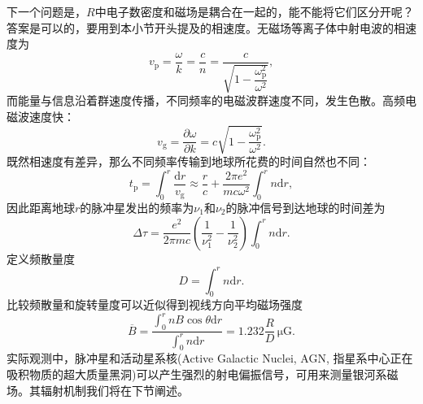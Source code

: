 \documentclass[../天体物理基础.tex]{subfiles}
\begin{document}
\newpage
下一个问题是，$R$中电子数密度和磁场是耦合在一起的，能不能将它们区分开呢？答案是可以的，要用到本小节开头提及的相速度。无磁场等离子体中射电波的相速度为
\begin{equation}
v_{\text{p}}=\frac{\omega}{k}=\frac{c}{n}=\frac{c}{\sqrt{1-\dfrac{\omega_{\text{p}}^{2}}{\omega^{2}}}},
\end{equation}
而能量与信息沿着群速度传播，不同频率的电磁波群速度不同，发生色散。高频电磁波速度快：
\begin{equation}
v_{\text{g}}=\frac{\partial{}\omega}{\partial{}k}=c\sqrt{1-\frac{\omega_{\text{p}}^{2}}{\omega^{2}}}.
\end{equation}
既然相速度有差异，那么不同频率传输到地球所花费的时间自然也不同：
\begin{equation}
t_{\text{p}}=\int_{0}^{r}\frac{\mathrm{d}r}{v_{\text{g}}}\approx\frac{r}{c}+\frac{2\pi e^{2}}{mc\omega^{2}}\int_{0}^{r}n\mathrm{d}r,
\end{equation}
因此距离地球$r$的脉冲星发出的频率为$\nu_{1}$和$\nu_{2}$的脉冲信号到达地球的时间差为
\begin{equation}
\Delta{}\tau=\frac{e^{2}}{2\pi mc}\left(\frac{1}{\nu_{1}^{2}}-\frac{1}{\nu_{2}^{2}}\right)\int_{0}^{r}n\mathrm{d}r.
\end{equation}
定义频散量度
\begin{equation}
D=\int_{0}^{r}n\mathrm{d}r.
\end{equation}
比较频散量和旋转量度可以近似得到视线方向平均磁场强度
\begin{equation}
\overline{B}=\frac{\int_{0}^{r}nB\cos\theta\mathrm{d}r}{\int_{0}^{r}n\mathrm{d}r}=1.232\frac{R}{D}\,\mathrm{\mu G}.
\end{equation}
实际观测中，脉冲星和活动星系核(Active Galactic Nuclei, AGN, 指星系中心正在吸积物质的超大质量黑洞)可以产生强烈的射电偏振信号，可用来测量银河系磁场。其辐射机制我们将在下节阐述。
\end{document}
